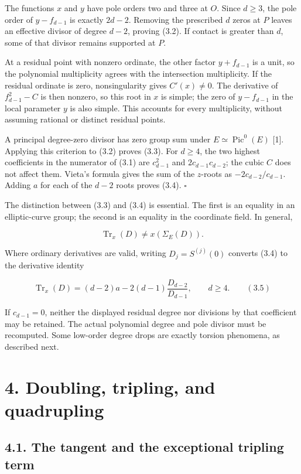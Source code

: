 \documentclass[
  11pt,
  a4paper,
]{article}
\begin{document}
The functions \(x\) and \(y\) have pole orders two and three at \(O\).
Since \(d\geq3\), the pole order of \(y-f_{d-1}\) is exactly \(2d-2\).
Removing the prescribed \(d\) zeros at \(P\) leaves an effective divisor
of degree \(d-2\), proving (3.2). If contact is greater than \(d\), some
of that divisor remains supported at \(P\).

At a residual point with nonzero ordinate, the other factor
\(y+f_{d-1}\) is a unit, so the polynomial multiplicity agrees with the
intersection multiplicity. If the residual ordinate is zero,
nonsingularity gives \(C'(x)\neq0\). The derivative of \(f_{d-1}^2-C\)
is then nonzero, so this root in \(x\) is simple; the zero of
\(y-f_{d-1}\) in the local parameter \(y\) is also simple. This accounts
for every multiplicity, without assuming rational or distinct residual
points.

A principal degree-zero divisor has zero group sum under
\(E\simeq\operatorname{Pic}^0(E)\) {[}1{]}. Applying this criterion to
(3.2) proves (3.3). For \(d\geq4\), the two highest coefficients in the
numerator of (3.1) are \(c_{d-1}^2\) and \(2c_{d-1}c_{d-2}\); the cubic
\(C\) does not affect them. Vieta's formula gives the sum of the
\(z\)-roots as \(-2c_{d-2}/c_{d-1}\). Adding \(a\) for each of the
\(d-2\) roots proves (3.4). \(\square\)

The distinction between (3.3) and (3.4) is essential. The first is an
equality in an elliptic-curve group; the second is an equality in the
coordinate field. In general,

\[
\operatorname{Tr}_x(D)\neq x(\Sigma_E(D)).
\]

Where ordinary derivatives are valid, writing \(D_j=S^{(j)}(0)\)
converts (3.4) to the derivative identity

\[
\operatorname{Tr}_x(D)=(d-2)a-2(d-1)\frac{D_{d-2}}{D_{d-1}},\qquad d\geq4. \qquad (3.5)
\]

If \(c_{d-1}=0\), neither the displayed residual degree nor divisions by
that coefficient may be retained. The actual polynomial degree and pole
divisor must be recomputed. Some low-order degree drops are exactly
torsion phenomena, as described next.

\section{4. Doubling, tripling, and
quadrupling}\label{doubling-tripling-and-quadrupling}

\subsection{4.1. The tangent and the exceptional tripling
term}\label{the-tangent-and-the-exceptional-tripling-term}
\end{document}
